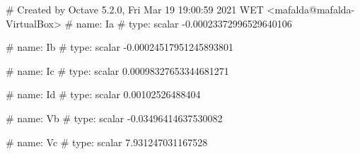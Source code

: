 # Created by Octave 5.2.0, Fri Mar 19 19:00:59 2021 WET <mafalda@mafalda-VirtualBox>
# name: Ia
# type: scalar
-0.00023372996529640106


# name: Ib
# type: scalar
-0.00024517951245893801


# name: Ic
# type: scalar
0.00098327653344681271


# name: Id
# type: scalar
0.00102526488404


# name: Vb
# type: scalar
-0.03496414637530082


# name: Vc
# type: scalar
7.931247031167528


